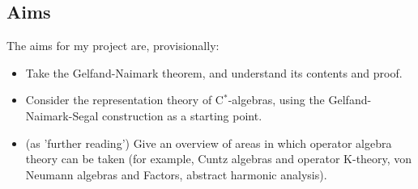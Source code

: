 \documentclass[12pt,a4paper]{amsart}
\theoremstyle{plain}
\theoremstyle{definition}
\begin{document}
\subsection{Aims}
The aims for my project are, provisionally:
\begin{itemize}

	\item Take the Gelfand-Naimark theorem, and understand its contents and proof.
	\item Consider the representation theory of C$^\ast$-algebras, using the Gelfand-Naimark-Segal construction as a starting point.
	\item (as 'further reading') Give an overview of areas in which operator algebra theory can be taken (for example, Cuntz algebras and operator K-theory, von Neumann algebras and Factors, abstract harmonic analysis).
\end{itemize}
\end{document}

